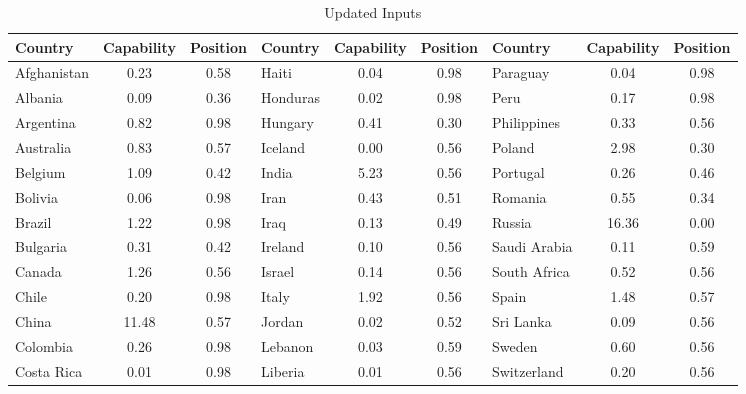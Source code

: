 \begin{landscape}
\begin{table}
  \centering
  \caption{Updated Inputs}
  \label{table:new_inputs}
  \begin{tabular}{lcc||lcc||lcc}
  \hline
  Country            & Capability & Position & Country     & Capability & Position & Country                  & Capability & Position \\
  \hline
Afghanistan        & 0.23       & 0.58     & Haiti       & 0.04       & 0.98     & Paraguay                 & 0.04       & 0.98     \\
Albania            & 0.09       & 0.36     & Honduras    & 0.02       & 0.98     & Peru                     & 0.17       & 0.98     \\
Argentina          & 0.82       & 0.98     & Hungary     & 0.41       & 0.30     & Philippines              & 0.33       & 0.56     \\
Australia          & 0.83       & 0.57     & Iceland     & 0.00       & 0.56     & Poland                   & 2.98       & 0.30     \\
Belgium            & 1.09       & 0.42     & India       & 5.23       & 0.56     & Portugal                 & 0.26       & 0.46     \\
Bolivia            & 0.06       & 0.98     & Iran        & 0.43       & 0.51     & Romania                  & 0.55       & 0.34     \\
Brazil             & 1.22       & 0.98     & Iraq        & 0.13       & 0.49     & Russia                   & 16.36      & 0.00     \\
Bulgaria           & 0.31       & 0.42     & Ireland     & 0.10       & 0.56     & Saudi Arabia             & 0.11       & 0.59     \\
Canada             & 1.26       & 0.56     & Israel      & 0.14       & 0.56     & South Africa             & 0.52       & 0.56     \\
Chile              & 0.20       & 0.98     & Italy       & 1.92       & 0.56     & Spain                    & 1.48       & 0.57     \\
China              & 11.48      & 0.57     & Jordan      & 0.02       & 0.52     & Sri Lanka                & 0.09       & 0.56     \\
Colombia           & 0.26       & 0.98     & Lebanon     & 0.03       & 0.59     & Sweden                   & 0.60       & 0.56     \\
Costa Rica         & 0.01       & 0.98     & Liberia     & 0.01       & 0.56     & Switzerland              & 0.20       & 0.56     \\

\end{tabular}
\end{table}
\end{landscape}
